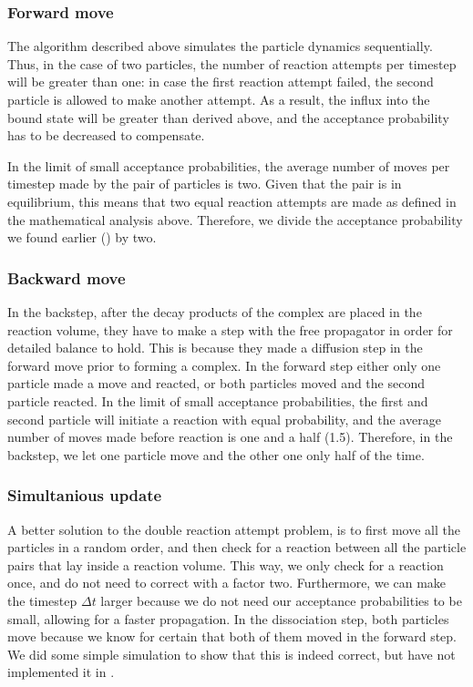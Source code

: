 \subsubsection{Forward move}
The algorithm described above simulates the particle dynamics sequentially. Thus, in the case of two particles, the number of reaction attempts per timestep will be greater than one: in case the first reaction attempt failed, the second particle is allowed to make another attempt. As a result, the influx into the bound state will be greater than derived above, and the acceptance probability has to be decreased to compensate.

In the limit of small acceptance probabilities, the average number of moves per timestep made by the pair of particles is two. Given that the pair is in equilibrium, this means that two equal reaction attempts are made as defined in the mathematical analysis above. Therefore, we divide the acceptance probability we found earlier () by two.

\subsubsection{Backward move}
In the backstep, after the decay products of the complex are placed in the reaction volume, they have to make a step with the free propagator in order for detailed balance to hold. This is because they made a diffusion step in the forward move prior to forming a complex. In the forward step either only one particle made a move and reacted, or both particles moved and the second particle reacted. In the limit of small acceptance probabilities, the first and second particle will initiate a reaction with equal probability, and the average number of moves made before reaction is one and a half (1.5). Therefore, in the backstep, we let one particle move and the other one only half of the time.

\subsubsection{Simultanious update}
A better solution to the double reaction attempt problem, is to first move all the particles in a random order, and then check for a reaction between all the particle pairs that lay inside a reaction volume. This way, we only check for a reaction once, and do not need to correct with a factor two. Furthermore, we can make the timestep $\Delta t$ larger because we do not need our acceptance probabilities to be small, allowing for a faster propagation. In the dissociation step, both particles move because we know for certain that both of them moved in the forward step. We did some simple simulation to show that this is indeed correct, but have not implemented it in \GFRD.



